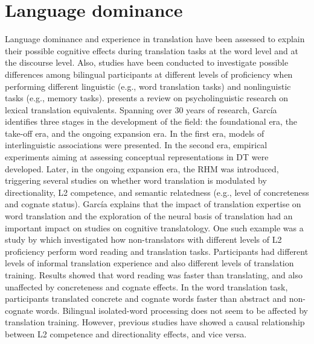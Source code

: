 \documentclass[output=paper]{langscibook}
\begin{document}
\section{Language dominance}
Language dominance and experience in translation have been assessed to explain their possible cognitive effects during translation tasks at the word level and at the discourse level. Also, studies have been conducted to investigate possible differences among bilingual participants at different levels of proficiency when performing different linguistic (e.g., word translation tasks) and nonlinguistic tasks (e.g., memory tasks). \citet{garcia2015psycholinguistic} presents a review on psycholinguistic research on lexical translation equivalents. Spanning over 30 years of research, García identifies three stages in the development of the field: the foundational era, the take-off era, and the ongoing expansion era. In the first era, models of interlinguistic associations were presented. In the second era, empirical experiments aiming at assessing conceptual representations in DT were developed. Later, in the ongoing expansion era, the RHM was introduced, triggering several studies on whether word translation is modulated by directionality, L2 competence, and semantic relatedness (e.g., level of concreteness and cognate status). García explains that the impact of translation expertise on word translation and the exploration of the neural basis of translation had an important impact on studies on cognitive translatology. One such example was a study by \citet{garcia2014word} which investigated how non-translators with different levels of L2 proficiency perform word reading and translation tasks. Participants had different levels of informal translation experience and also different levels of translation training. Results showed that word reading was faster than translating, and also unaffected by concreteness and cognate effects. In the word translation task, participants translated concrete and cognate words faster than abstract and non-cognate words. Bilingual isolated-word processing does not seem to be affected by translation training. However, previous studies have showed a causal relationship between L2 competence and directionality effects, and vice versa. 
\end{document}
